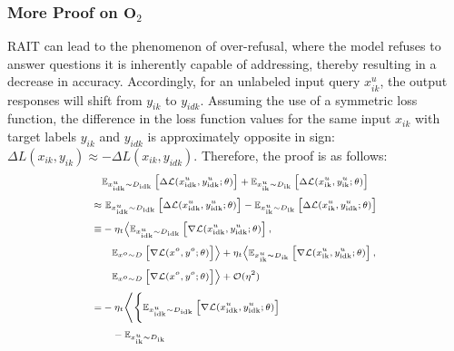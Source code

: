 \subsubsection{More Proof on $\mathbf{O}_2$}
\label{app:More Proof on O2}
RAIT can lead to the phenomenon of over-refusal, where the model refuses to answer questions it is inherently capable of addressing, thereby resulting in a decrease in accuracy. Accordingly, for an unlabeled input query $x_{ik}^u$, the output responses will shift from $y_{ik}$ to $y_{idk}$. Assuming the use of a symmetric loss function, the difference in the loss function values for the same input $x_{ik}$ with target labels $y_{ik}$ and $y_{idk}$ is approximately opposite in sign: $\Delta L(x_{ik}, y_{ik}) \approx -\Delta L(x_{ik}, y_{idk})$. Therefore, the proof is as follows:
\begin{equation}
\scriptsize
\setlength{\jot}{5pt} %
\label{eq:loss_decomposition}
\begin{aligned}
&\mathbb{E}_{x^{u}_{\text{idk}} \sim D_{\text{idk}}} \left[ \Delta \mathcal{L}(x^{u}_{\text{idk}}, y^{u}_{\text{idk}}; \theta) \right] 
+ \mathbb{E}_{x^{u}_{\text{ik}} \sim D_{\text{ik}}} \left[ \Delta \mathcal{L}(x^{u}_{\text{ik}}, y^{u}_{\text{ik}}; \theta) \right] \\ 
\approx & ~\mathbb{E}_{x^{u}_{\text{idk}} \sim D_{\text{idk}}} \left[ \Delta \mathcal{L}(x^{u}_{\text{idk}}, y^{u}_{\text{idk}}; \theta) \right] 
- \mathbb{E}_{x^{u}_{\text{ik}} \sim D_{\text{ik}}} \left[ \Delta \mathcal{L}(x^{u}_{\text{ik}}, y^{u}_{\text{idk}}; \theta) \right] \\ 
\equiv & -\eta_t \Bigl \langle  
\mathbb{E}_{x^{u}_{\text{idk}} \sim D_{\text{idk}}} \left[ \nabla \mathcal{L}(x^{u}_{\text{idk}}, y^{u}_{\text{idk}}; \theta) \right], \\
&\quad \mathbb{E}_{x^{o} \sim D} \left[ \nabla \mathcal{L}(x^{o}, y^{o}; \theta) \right] \Bigr \rangle + \eta_t \Bigl \langle  
\mathbb{E}_{x^{u}_{\text{ik}} \sim D_{\text{ik}}} \left[ \nabla \mathcal{L}(x^{u}_{\text{ik}}, y^{u}_{\text{idk}}; \theta) \right], \\
&\quad \mathbb{E}_{x^{o} \sim D} \left[ \nabla \mathcal{L}(x^{o}, y^{o}; \theta) \right] \Bigr \rangle + \mathcal{O}(\eta^2) \\ 
= & - \eta_t \Bigg\langle 
\Bigg\{ \mathbb{E}_{x^{u}_{\text{idk}} \sim D_{\text{idk}}} 
\left[ \nabla \mathcal{L}(x^{u}_{\text{idk}}, y^{u}_{\text{idk}}; \theta) \right] \\
& \quad - \mathbb{E}_{x^{u}_{\text{ik}} \sim D_{\text{ik}}} 

\end{aligned}
\end{equation}
